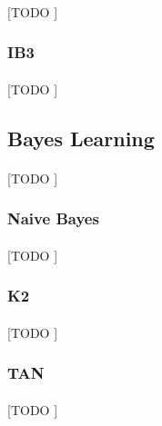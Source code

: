 \documentclass{article}
\begin{document}
				\paragraph{}
				[TODO ]

			\subsubsection{IB3}
			\label{sec:ib3}

				\paragraph{}
				[TODO ]

		\subsection{Bayes Learning}
		\label{sec:decision-trees}

			\paragraph{}
			[TODO ]

			\subsubsection{Naive Bayes}
			\label{sec:naive-bayes}

				\paragraph{}
				[TODO ]

			\subsubsection{K2}
			\label{sec:k2-bayes}

				\paragraph{}
				[TODO ]

			\subsubsection{TAN}
			\label{sec:tan-bayes}

				\paragraph{}
				[TODO ]
\end{document}
